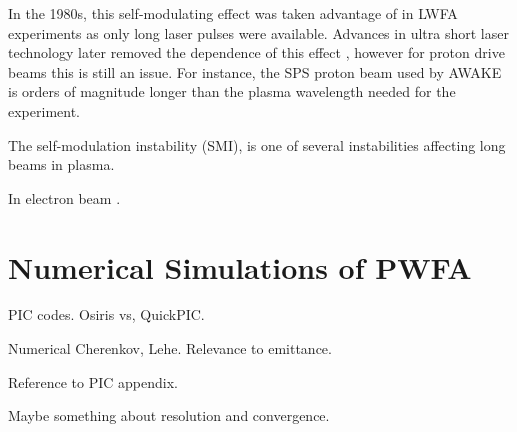 In the 1980s, this self-modulating effect was taken advantage of in LWFA experiments as only long laser pulses were available. Advances in ultra short laser technology later removed the dependence of this effect \cite{pukhov:2002}, however for proton drive beams this is still an issue. For instance, the SPS proton beam used by AWAKE is orders of magnitude longer than the plasma wavelength needed for the experiment.

The self-modulation instability (SMI), is one of several instabilities affecting long beams in plasma.


In electron beam \cite{muggli:2014}.

\section{Numerical Simulations of PWFA}
\label{Int:Sim}

PIC codes. Osiris vs, QuickPIC.

Numerical Cherenkov, Lehe. Relevance to emittance.

Reference to PIC appendix.

Maybe something about resolution and convergence.


